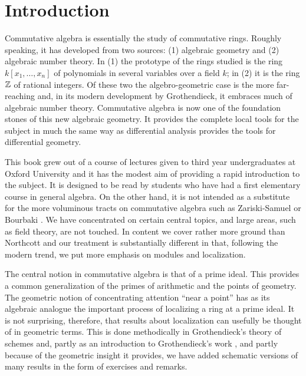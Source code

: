 \chapter*{Introduction}
{}

Commutative algebra is essentially the study of commutative rings. Roughly speaking, it has developed from two sources: (1) algebraic geometry and (2) algebraic number theory. In (1) the prototype of the rings studied is the ring $k[x_1, \ldots, x_n]$ of polynomials in several variables over a field $k$; in (2) it is the ring $\mathbb{Z}$ of rational integers. Of these two the algebro-geometric case is the more far-reaching and, in its modern development by Grothendieck, it embraces much of algebraic number theory. Commutative algebra is now one of the foundation stones of this new algebraic geometry. It provides the complete local tools for the subject in much the same way as differential analysis provides the tools for differential geometry.

This book grew out of a course of lectures given to third year undergraduates at Oxford University and it has the modest aim of providing a rapid introduction to the subject. It is designed to be read by students who have had a first elementary course in general algebra. On the other hand, it is not intended as a substitute for the more voluminous tracts on commutative algebra such as Zariski-Samuel \cite{ZariskiSamuel} or Bourbaki \cite{Bourbaki}. We have concentrated on certain central topics, and large areas, such as field theory, are not touched. In content we cover rather more ground than Northcott \cite{Northcott} and our treatment is substantially different in that, following the modern trend, we put more emphasis on modules and localization.

The central notion in commutative algebra is that of a prime ideal. This provides a common generalization of the primes of arithmetic and the points of geometry. The geometric notion of concentrating attention ``near a point'' has as its algebraic analogue the important process of localizing a ring at a prime ideal. It is not surprising, therefore, that results about localization can usefully be thought of in geometric terms. This is done methodically in Grothendieck's theory of schemes and, partly as an introduction to Grothendieck's work \cite{Grothendieck}, and partly because of the geometric insight it provides, we have added schematic versions of many results in the form of exercises and remarks.

